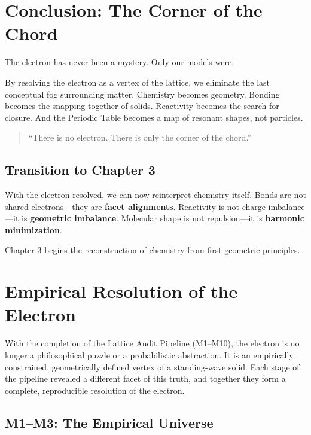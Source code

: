 \documentclass[11pt, letterpaper, openany]{book}
\begin{document}
\section{Conclusion: The Corner of the Chord}

The electron has never been a mystery. Only our models were.

By resolving the electron as a vertex of the lattice, we eliminate the last conceptual fog
surrounding matter. Chemistry becomes geometry. Bonding becomes the snapping
together of solids. Reactivity becomes the search for closure. And the Periodic Table
becomes a map of resonant shapes, not particles.

\begin{quote}
“There is no electron.  
There is only the corner of the chord.”
\end{quote}

\subsection*{Transition to Chapter 3}

With the electron resolved, we can now reinterpret chemistry itself.  
Bonds are not shared electrons—they are \textbf{facet alignments}.  
Reactivity is not charge imbalance—it is \textbf{geometric imbalance}.  
Molecular shape is not repulsion—it is \textbf{harmonic minimization}.

Chapter 3 begins the reconstruction of chemistry from first geometric principles.


\section{Empirical Resolution of the Electron}

With the completion of the Lattice Audit Pipeline (M1–M10), the electron is no longer a
philosophical puzzle or a probabilistic abstraction. It is an empirically constrained,
geometrically defined vertex of a standing-wave solid. Each stage of the pipeline revealed
a different facet of this truth, and together they form a complete, reproducible resolution
of the electron.

\subsection*{M1–M3: The Empirical Universe}
\end{document}
